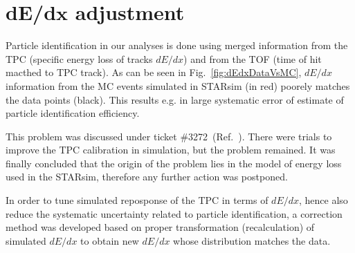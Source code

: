 

\chapter{\texorpdfstring{d$\bm{E}$/d$\bm{x}$}{dE/dx} adjustment}\label{chap:dEdxCorrection}

Particle identification in our analyses is done using merged information from the TPC (specific energy loss of tracks $dE/dx$) and from the TOF (time of hit macthed to TPC track). As can be seen in Fig.~\ref{fig:dEdxDataVsMC}, $dE/dx$ information from the MC events simulated in STARsim (in red) poorely matches the data points (black). This results e.g. in large systematic error of estimate of particle identification efficiency.

This problem was discussed under ticket \#3272~(Ref.~\cite{dedxTicket}). There were trials to improve the TPC calibration in simulation, but the problem remained. It was finally concluded that the origin of the problem lies in the model of energy loss used in the STARsim, therefore any further action was postponed. 

In order to tune simulated reposponse of the TPC in terms of $dE/dx$, hence also reduce the systematic uncertainty related to particle identification, a correction method was developed based on proper transformation (recalculation) of simulated $dE/dx$ to obtain new $dE/dx$ whose distribution matches the data.

